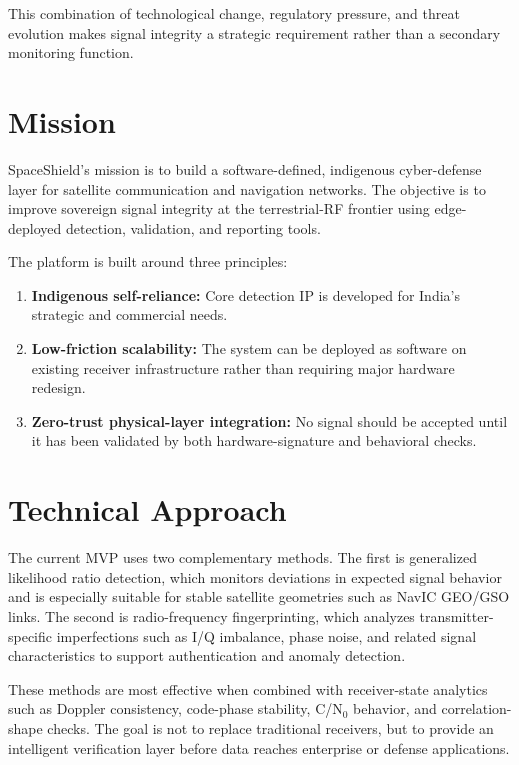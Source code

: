 \documentclass[11pt,a4paper]{article}
\begin{document}
This combination of technological change, regulatory pressure, and threat evolution makes signal integrity a strategic requirement rather than a secondary monitoring function.

\section{Mission}

SpaceShield’s mission is to build a software-defined, indigenous cyber-defense layer for satellite communication and navigation networks. The objective is to improve sovereign signal integrity at the terrestrial-RF frontier using edge-deployed detection, validation, and reporting tools.

The platform is built around three principles:

\begin{enumerate}
    \item \textbf{Indigenous self-reliance:} Core detection IP is developed for India’s strategic and commercial needs.
    \item \textbf{Low-friction scalability:} The system can be deployed as software on existing receiver infrastructure rather than requiring major hardware redesign.
    \item \textbf{Zero-trust physical-layer integration:} No signal should be accepted until it has been validated by both hardware-signature and behavioral checks.
\end{enumerate}

\section{Technical Approach}

The current MVP uses two complementary methods. The first is generalized likelihood ratio detection, which monitors deviations in expected signal behavior and is especially suitable for stable satellite geometries such as NavIC GEO/GSO links. The second is radio-frequency fingerprinting, which analyzes transmitter-specific imperfections such as I/Q imbalance, phase noise, and related signal characteristics to support authentication and anomaly detection.

These methods are most effective when combined with receiver-state analytics such as Doppler consistency, code-phase stability, C/N$_0$ behavior, and correlation-shape checks. The goal is not to replace traditional receivers, but to provide an intelligent verification layer before data reaches enterprise or defense applications.
\end{document}
